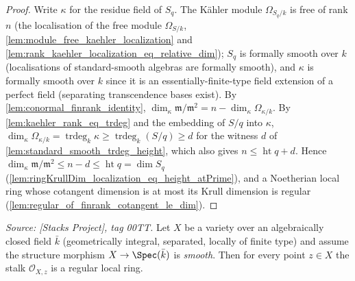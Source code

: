 \begin{proof}
  \leanok
  Write \(\kappa\) for the residue field of \(S_q\). The K\"ahler module
  \(\Omega_{S_q/k}\) is free of rank \(n\) (the localisation of the free
  module \(\Omega_{S/k}\), \cref{lem:module_free_kaehler_localization} and
  \cref{lem:rank_kaehler_localization_eq_relative_dim}); \(S_q\) is formally
  smooth over \(k\) (localisations of standard-smooth algebras are formally
  smooth), and \(\kappa\) is formally smooth over \(k\) since it is an
  essentially-finite-type field extension of a perfect field (separating
  transcendence bases exist). By \cref{lem:conormal_finrank_identity},
  \(\dim_\kappa \mathfrak m/\mathfrak m^2 = n - \dim_\kappa \Omega_{\kappa/k}\).
  By \cref{lem:kaehler_rank_eq_trdeg} and the embedding of \(S/q\) into
  \(\kappa\), \(\dim_\kappa \Omega_{\kappa/k} = \operatorname{trdeg}_k \kappa
  \ge \operatorname{trdeg}_k (S/q) \ge d\) for the witness \(d\) of
  \cref{lem:standard_smooth_trdeg_height}, which also gives
  \(n \le \operatorname{ht} q + d\). Hence
  \(\dim_\kappa \mathfrak m/\mathfrak m^2 \le n - d \le \operatorname{ht} q
  = \dim S_q\) (\cref{lem:ringKrullDim_localization_eq_height_atPrime}), and a
  Noetherian local ring whose cotangent dimension is at most its Krull
  dimension is regular (\cref{lem:regular_of_finrank_cotangent_le_dim}).
\end{proof}

\begin{lemma}
  \label{lem:smooth_to_regular_local_ring}
  \textit{Source: [Stacks Project], tag 00TT.}
  Let \(X\) be a variety over an algebraically closed field \(\bar k\)
  (geometrically integral, separated, locally of finite type) and assume the
  structure morphism \(X \to \Spec(\bar k)\) is \emph{smooth}. Then for every
  point \(z \in X\) the stalk \(\mathcal O_{X, z}\) is a regular local ring.
\end{lemma}

